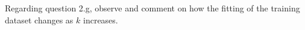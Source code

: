 \item {}

Regarding question 2.g, observe and comment on how the fitting of the training dataset changes as $k$ increases.